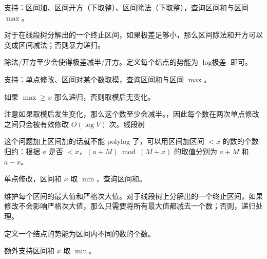 \begin{example}[开方、除法]
    支持：区间加、区间开方（下取整）、区间除法（下取整），查询区间和与区间 $\max$。
\end{example}
\begin{solution}
    对于在线段树分解出的一个终止区间，如果极差足够小，那么区间除法和开方可以变成区间减法；否则暴力递归。

    除法/开方至少会使得极差减半/开方。定义每个结点的势能为 $\log\text{极差}$ 即可。
\end{solution}
\begin{example}[取模]
    支持：单点修改、区间对某个数取模，查询区间和与区间 $\max$。
\end{example}
\begin{solution}
    如果 $\max\ge x$ 那么递归，否则取模后无变化。

    注意如果取模后发生变化，那么这个数至少会减半。，因此每个数在两次单点修改之间只会被有效修改 $O(\log V)$ 次。线段树
\end{solution}
\begin{remark}
    这个问题加上区间加的话就不能 polylog 了，可以用区间加区间 $<x$ 的数的个数归约：根据 $a$ 是否 $<x$，$(a+M)\bmod (M+x)$ 的取值分别为 $a+M$ 和 $a-x$。
\end{remark}

\begin{exercise}[P3747]
\end{exercise}


\begin{example}
    单点修改，区间和 $x$ 取 $\min$，查询区间和。
\end{example}
\begin{solution}
    维护每个区间的最大值和严格次大值。对于线段树上分解出的一个终止区间，如果修改不会影响严格次大值，那么只需要将所有最大值都减去一个数；否则，递归处理。

    定义一个结点的势能为区间内不同的数的个数。
\end{solution}
\begin{exercise}
    额外支持区间和 $x$ 取 $\min$。
\end{exercise}

